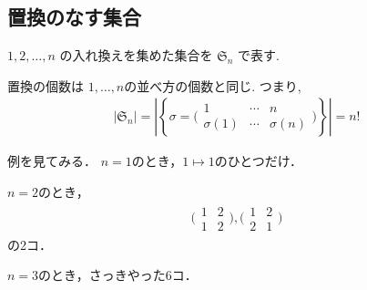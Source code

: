 \documentclass[11pt, a4paper, dvipdfmx]{jsarticle}
\theoremstyle{definition}
\theoremstyle{mystyle}
\numberwithin{equation}{section} %
\begin{document}
\subsection{置換のなす集合}

$1,2,\ldots,n$ の入れ換えを集めた集合を
$\mathfrak{S}_n$
で表す.

置換の個数は $1,\ldots,n$の並べ方の個数と同じ. 
つまり, 
\begin{align*}
    |\mathfrak{S}_n| 
    = \left|\left\{ 
        \sigma = \Big(\begin{array}{ccc}
        1 & \cdots & n \\
        \sigma(1) & \cdots & \sigma(n)
    \end{array}\Big) 
    \right\}\right| = n!
\end{align*}

例を見てみる．
$n=1$のとき，$1\mapsto 1$のひとつだけ．
    
$n=2$のとき，
\begin{align*}
    \Big(\begin{array}{cc}
        1 & 2 \\
        1 & 2 
    \end{array}\Big),
    \Big(\begin{array}{cc}
        1 & 2 \\
        2 & 1 
    \end{array}\Big) 
\end{align*}
の2コ．

$n=3$のとき，さっきやった6コ．
\end{document}
